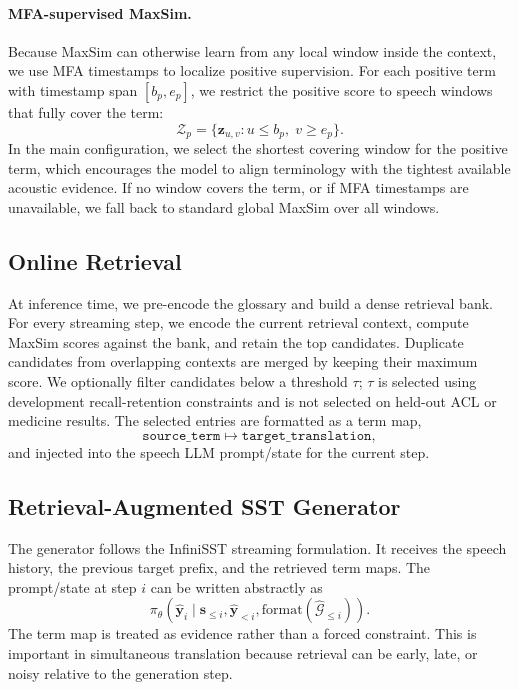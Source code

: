 \paragraph{MFA-supervised MaxSim.}
Because MaxSim can otherwise learn from any local window inside the context, we use MFA timestamps to localize positive supervision.  For each positive term with timestamp span $[b_p,e_p]$, we restrict the positive score to speech windows that fully cover the term:
\begin{equation}
  \mathcal{Z}_p
  =
  \{\mathbf{z}_{u,v}: u \le b_p,\; v \ge e_p\}.
\end{equation}
In the main configuration, we select the shortest covering window for the positive term, which encourages the model to align terminology with the tightest available acoustic evidence.  If no window covers the term, or if MFA timestamps are unavailable, we fall back to standard global MaxSim over all windows.

\subsection{Online Retrieval}
\label{sec:retriever_inference}

At inference time, we pre-encode the glossary and build a dense retrieval bank.  For every streaming step, we encode the current retrieval context, compute MaxSim scores against the bank, and retain the top candidates.  Duplicate candidates from overlapping contexts are merged by keeping their maximum score.  We optionally filter candidates below a threshold $\tau$; $\tau$ is selected using development recall-retention constraints and is not selected on held-out ACL or medicine results.  The selected entries are formatted as a term map,
\begin{equation}
  \texttt{source\_term} \mapsto \texttt{target\_translation},
\end{equation}
and injected into the speech LLM prompt/state for the current step.

\subsection{Retrieval-Augmented SST Generator}
\label{sec:rag_sst_generator}

The generator follows the InfiniSST streaming formulation.  It receives the speech history, the previous target prefix, and the retrieved term maps.  The prompt/state at step $i$ can be written abstractly as
\begin{equation}
  \pi_\theta
  \left(
    \hat{\mathbf{y}}_i
    \mid
    \mathbf{s}_{\le i},
    \hat{\mathbf{y}}_{<i},
    \mathrm{format}(\hat{\mathcal{G}}_{\le i})
  \right).
\end{equation}
The term map is treated as evidence rather than a forced constraint.  This is important in simultaneous translation because retrieval can be early, late, or noisy relative to the generation step.

